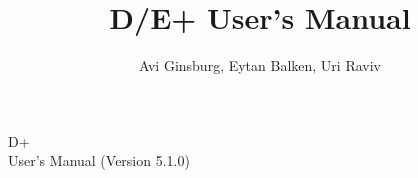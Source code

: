 \documentclass[12pt,a4paper,openany,oneside,oldfontcommands]{memoir}
\author{Avi Ginsburg, Eytan Balken, Uri Raviv}
\title{D/E+ User's Manual}
\begin{document}
\frontmatter
\thispagestyle{empty} %
\vspace*{\fill}
\begin{center}
\HUGE D+ \\
\medskip
\Large User's Manual (Version 5.1.0)
\end{center}
\vspace*{\fill}

\newpage
\tableofcontents






\mainmatter






\begin{refsection}

\end{refsection}

\begin{refsection}

\end{refsection}











%

\nocite{*}
\printbibliography[]
\end{document}
